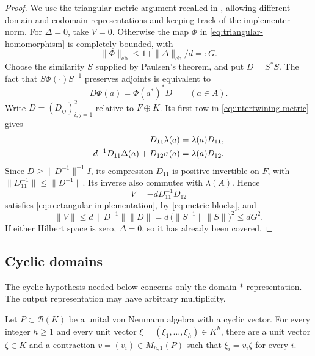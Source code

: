 \begin{proof}
We use the triangular-metric argument recalled in
\citet[Lemma~1.2]{Ozawa2006}, allowing different domain and codomain
representations and keeping track of the implementer norm.
For \(\Delta=0\), take \(V=0\). Otherwise the map \(\Phi\) in
\eqref{eq:triangular-homomorphism} is completely bounded, with
\[
 \|\Phi\|_{\mathrm{cb}}
 \le 1+\|\Delta\|_{\mathrm{cb}}/d=:G.
\]
Choose the similarity \(S\) supplied by Paulsen's theorem, and put
\(D=S^*S\). The fact that \(S\Phi(\cdot)S^{-1}\) preserves adjoints
is equivalent to
\begin{equation}
 D\Phi(a)=\Phi(a^*)^*D\qquad(a\in A).
 \label{eq:intertwining-metric}
\end{equation}
Write \(D=(D_{ij})_{i,j=1}^2\) relative to \(F\oplus K\). Its first
row in \eqref{eq:intertwining-metric} gives
\begin{align}
 D_{11}\lambda(a)&=\lambda(a)D_{11},\notag\\
 d^{-1}D_{11}\Delta(a)+D_{12}\sigma(a)&=\lambda(a)D_{12}.
 \label{eq:metric-blocks}
\end{align}
Since \(D\ge\|D^{-1}\|^{-1}I\), its compression \(D_{11}\) is
positive invertible on \(F\), with
\(\|D_{11}^{-1}\|\le\|D^{-1}\|\). Its inverse also commutes with
\(\lambda(A)\). Hence
\[
 V=-dD_{11}^{-1}D_{12}
\]
satisfies \eqref{eq:rectangular-implementation}, by
\eqref{eq:metric-blocks}, and
\[
 \|V\|
 \le d\,\|D^{-1}\|\|D\|
 =d\,\bigl(\|S^{-1}\|\|S\|\bigr)^2
 \le dG^2.
\]
If either Hilbert space is zero, \(\Delta=0\), so it has already been
covered.
\end{proof}

\subsection{Cyclic domains}

The cyclic hypothesis needed below concerns only the domain
\(*\)-representation. The output representation may have arbitrary
multiplicity.

\begin{lemma}
\label{lem:cyclic-factorization}
Let \(P\subset\mathcal B(K)\) be a unital von Neumann algebra with a
cyclic vector. For every integer \(h\ge1\) and every unit vector
\(\xi=(\xi_1,\ldots,\xi_h)\in K^h\), there are a unit vector
\(\zeta\in K\) and a contraction \(v=(v_i)\in M_{h,1}(P)\) such
that \(\xi_i=v_i\zeta\) for every \(i\).
\end{lemma}

